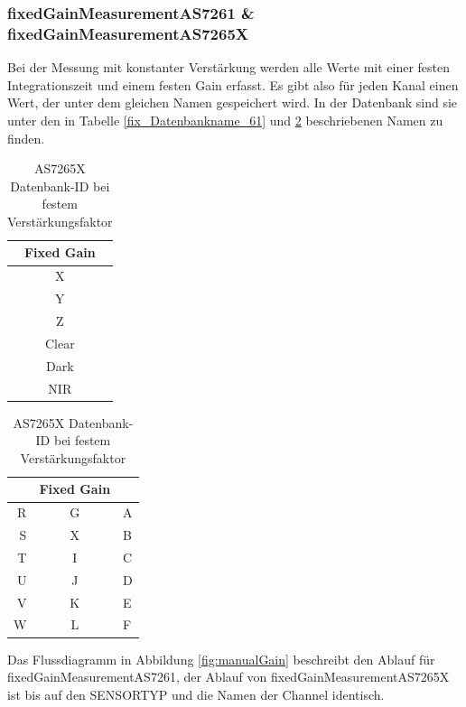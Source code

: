 \subsubsection{fixedGainMeasurementAS7261 \& fixedGainMeasurementAS7265X}
Bei der Messung mit konstanter Verstärkung werden alle Werte mit einer festen Integrationszeit und einem festen Gain erfasst. Es gibt also für jeden Kanal einen Wert, der unter dem gleichen Namen gespeichert wird. In der Datenbank sind sie unter den in Tabelle \ref{fix_Datenbankname_61} und \ref{fix_Datenbankname_65} beschriebenen Namen zu finden.

\begin{table}[H]
\parbox{.45\linewidth}{
\centering
\begin{tabular}{ c }
Fixed Gain \\
\hline
X \\ 
Y  \\
Z  \\
Clear \\ 
Dark \\ 
NIR \\ 
\end{tabular}
\caption{AS7261 Datenbank-ID bei festem Verstärkungsfaktor}
\label{fix_Datenbankname_61}

}
\hfill
\parbox{.45\linewidth}{
\centering
\begin{tabular}{ r c l}
&Fixed Gain \\
\hline
 	R & G & A \\  
 	S & X & B \\
 	T & I & C \\  
 	U & J & D \\
 	V & K & E \\  
 	W & L & F \\

\end{tabular}
\caption{AS7265X Datenbank-ID bei festem Verstärkungsfaktor}
\label{fix_Datenbankname_65}
}
\end{table}




\noindent Das Flussdiagramm in Abbildung \ref{fig:manualGain} beschreibt den Ablauf für fixedGainMeasurementAS7261,
der Ablauf von fixedGainMeasurementAS7265X ist bis auf den SENSORTYP und die Namen der Channel identisch.

